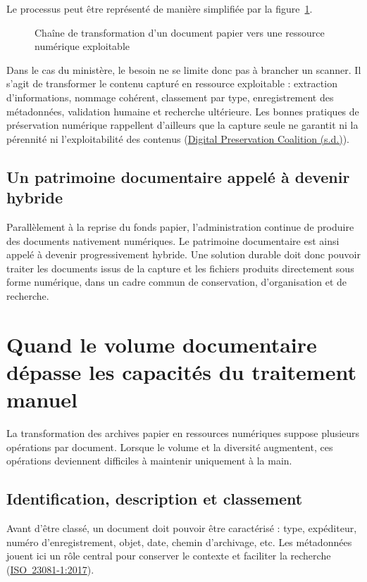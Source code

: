 \documentclass[12pt,a4paper]{report}
\newcommand{\citer}[2]{\hyperref[ref:#1]{#2}}
\begin{document}
Le processus peut être représenté de manière simplifiée par la figure~\ref{fig:chaine-transformation-archives}.

\begin{figure}[htbp]
\centering
\resizebox{\textwidth}{!}{}
\caption{Chaîne de transformation d'un document papier vers une ressource numérique exploitable}
\label{fig:chaine-transformation-archives}
\end{figure}

Dans le cas du ministère, le besoin ne se limite donc pas à brancher un scanner. Il s'agit de transformer le contenu capturé en ressource exploitable : extraction d'informations, nommage cohérent, classement par type, enregistrement des métadonnées, validation humaine et recherche ultérieure. Les bonnes pratiques de préservation numérique rappellent d'ailleurs que la capture seule ne garantit ni la pérennité ni l'exploitabilité des contenus (\citer{dpc}{Digital Preservation Coalition (s.d.)}).

\subsection{Un patrimoine documentaire appelé à devenir hybride}
Parallèlement à la reprise du fonds papier, l'administration continue de produire des documents nativement numériques. Le patrimoine documentaire est ainsi appelé à devenir progressivement hybride. Une solution durable doit donc pouvoir traiter les documents issus de la capture et les fichiers produits directement sous forme numérique, dans un cadre commun de conservation, d'organisation et de recherche.

\section{Quand le volume documentaire dépasse les capacités du traitement manuel}
La transformation des archives papier en ressources numériques suppose plusieurs opérations par document. Lorsque le volume et la diversité augmentent, ces opérations deviennent difficiles à maintenir uniquement à la main.

\subsection{Identification, description et classement}
Avant d'être classé, un document doit pouvoir être caractérisé : type, expéditeur, numéro d'enregistrement, objet, date, chemin d'archivage, etc. Les métadonnées jouent ici un rôle central pour conserver le contexte et faciliter la recherche (\citer{iso23081}{\mbox{ISO 23081-1:2017}}).
\end{document}
